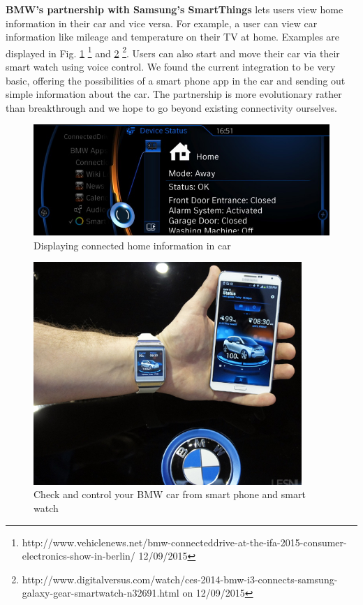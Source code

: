 \textbf{BMW's partnership with Samsung's SmartThings} lets users view home information in their car and vice versa. For example, a user can view car information like mileage and temperature on their TV at home. Examples are displayed in Fig. \ref{fig.SamsungBMW1}    \footnote{http://www.vehiclenews.net/bmw-connecteddrive-at-the-ifa-2015-consumer-electronics-show-in-berlin/ 12/09/2015} and \ref{fig.SamsungBMW2} \footnote{http://www.digitalversus.com/watch/ces-2014-bmw-i3-connects-samsung-galaxy-gear-smartwatch-n32691.html on 12/09/2015}. Users can also start and move their car via their smart watch using voice control. We found the current integration to be very basic, offering the possibilities of a smart phone app in the car and sending out simple information about the car. The partnership is more evolutionary rather than breakthrough and we hope to go beyond existing connectivity ourselves.

\begin{figure}
	\centering
	\includegraphics[keepaspectratio, width=5in]{Figures/BenchmarkingOld/SamsungBMW1.jpg}
	\caption{Displaying connected home information in car}
    \label{fig.SamsungBMW1}
\end{figure}

\begin{figure}
    \centering
    \includegraphics[keepaspectratio, width=4in]{Figures/BenchmarkingOld/SamsungBMW2.jpg}
	\caption{Check and control your BMW car from smart phone and smart watch}
    \label{fig.SamsungBMW2}
\end{figure}

